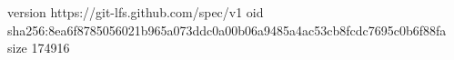 version https://git-lfs.github.com/spec/v1
oid sha256:8ea6f8785056021b965a073ddc0a00b06a9485a4ac53cb8fcdc7695c0b6f88fa
size 174916
